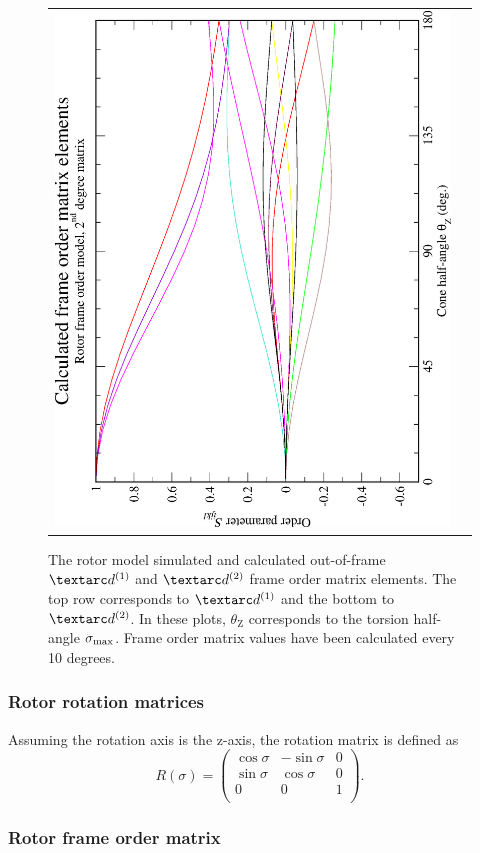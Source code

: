 \begin{figure}
\begin{tabular}{@{}cc@{}}
    \includegraphics[width=.35\textwidth,angle=270]{images/frame_order_matrix/Sijkl_rotor_out_of_frame_theta_z_calc.eps} \\
  \end{tabular}
  \caption[Rotor simulated and calculated out-of-frame Daeg$^{(1)}$ and Daeg$^{(2)}$ elements.]{
    The rotor model simulated and calculated out-of-frame $\FOone$ and $\FOtwo$ frame order matrix elements.
    The top row corresponds to $\FOone$ and the bottom to $\FOtwo$.
    In these plots, $\theta_\textrm{Z}$ corresponds to the torsion half-angle $\sigma_\textrm{max}$.
    Frame order matrix values have been calculated every 10 degrees.
  }
  \label{fig: simulated and calculated out-of-frame 1st and 2nd degree rotor frame order}
\end{figure}


\subsubsection{Rotor rotation matrices}

Assuming the rotation axis is the z-axis, the rotation matrix is defined as
\begin{equation}\label{eq: R matrix torsion}
    R(\sigma) =
        \begin{pmatrix}
            \cos\sigma & -\sin\sigma & 0 \\
            \sin\sigma & \cos\sigma  & 0 \\
            0          & 0           & 1 \\
        \end{pmatrix}.
\end{equation}

\subsubsection{Rotor frame order matrix}


